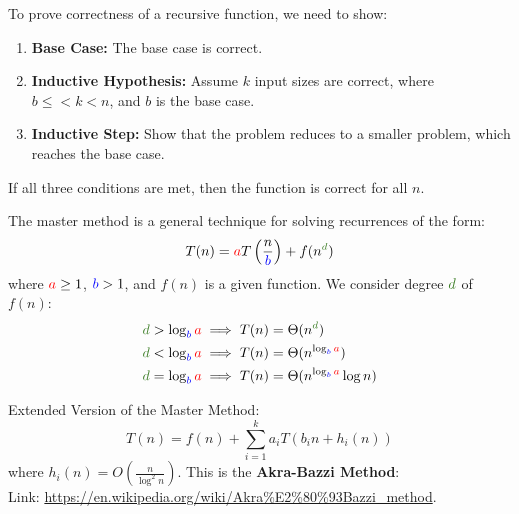 \newpage

\begin{theo}

    To prove correctness of a recursive function, we need to show:
    \begin{enumerate}
        \item \textbf{Base Case:} The base case is correct.
        \item \textbf{Inductive Hypothesis:} Assume $k$ input sizes are correct, where $b\leq<k<n$, and $b$ is the base case. 
        \item \textbf{Inductive Step:} Show that the problem reduces to a smaller problem, which reaches the base case.
    \end{enumerate}
    If all three conditions are met, then the function is correct for all $n$.
\end{theo}

\begin{theo}

    The master method is a general technique for solving recurrences of the form:
    \begin{equation*}
        T(n) = \textcolor{red}{a}T\left(\dfrac{n}{\textcolor{blue}{b}}\right) + f(n^{\textcolor{OliveGreen}{d}})
        \end{equation*}
        where $\textcolor{red}{a} \geq 1$, $\textcolor{blue}{b} > 1$, and $f(n)$ is a given function. We consider degree $\textcolor{OliveGreen}{d}$ of $f(n)$:
        \begin{align*}
        \textcolor{OliveGreen}{d} > \log_{\textcolor{blue}{b}} \textcolor{red}{a} &\implies T(n) = \Theta(n^{\textcolor{OliveGreen}{d}}) \\
        \textcolor{OliveGreen}{d} < \log_{\textcolor{blue}{b}} \textcolor{red}{a} &\implies T(n) = \Theta(n^{\log_{\textcolor{blue}{b}} \textcolor{red}{a}}) \\
        \textcolor{OliveGreen}{d} = \log_{\textcolor{blue}{b}} \textcolor{red}{a} &\implies T(n) = \Theta(n^{\log_{\textcolor{blue}{b}} \textcolor{red}{a}} \log n)
        \end{align*}
    
\end{theo}

\begin{Tip}
    Extended Version of the Master Method:
    \\ $$T(n) = f(n) + \sum_{i=1}^{k} a_i T(b_i n + h_i(n))$$
    where  $h_i(n) = O\left( \frac{n}{\log^2 n} \right)$. This is the \textbf{Akra-Bazzi Method}:\\
    Link: \url{https://en.wikipedia.org/wiki/Akra%E2%80%93Bazzi_method}.
\end{Tip}

